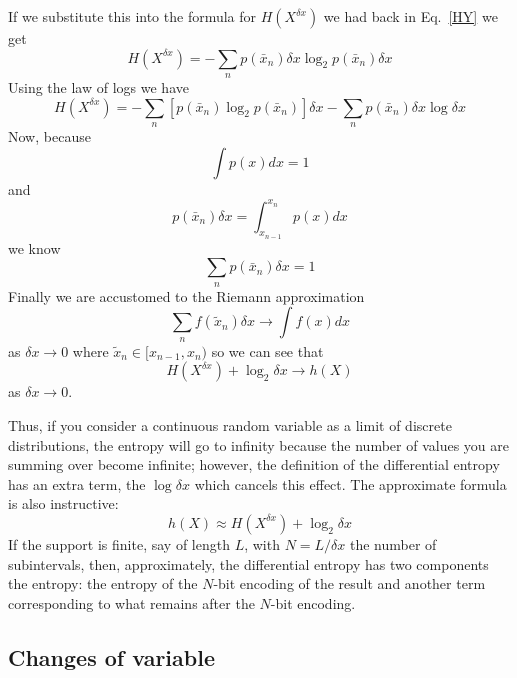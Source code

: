 \documentclass[12pt]{article}
\begin{document}
If we substitute this into the formula for $H(X^{\delta x})$ we had back in Eq.~\ref{HY} we get 
\begin{equation}
  H(X^{\delta x})=-\sum_n p(\bar{x}_n)\delta x \log_2{p(\bar{x}_n)\delta x}
\end{equation}
Using the law of logs we have
\begin{equation}
  H(X^{\delta x})=-\sum_n \left[p(\bar{x}_n) \log_2{p(\bar{x}_n)}\right] \delta x -\sum_np(\bar{x}_n)\delta x \log{\delta x}
\end{equation}
Now, because
\begin{equation}
  \int p(x)dx=1
\end{equation}
and 
\begin{equation}
  p(\bar{x}_n)\delta x=\int_{x_{n-1}}^{x_n}p(x)dx
\end{equation}
we know
\begin{equation}
  \sum_np(\bar{x}_n)\delta x=1     
\end{equation}
Finally we are accustomed to the Riemann approximation
\begin{equation}
  \sum_n f(\tilde{x}_n) \delta x\rightarrow \int f(x)dx 
\end{equation}
as $\delta x\rightarrow 0$ where $\tilde{x}_n\in [x_{n-1},x_n)$ so we can see that
    \begin{equation}
      H(X^{\delta x})+\log_2{\delta x}\rightarrow h(X)
    \end{equation}
    as $\delta x\rightarrow 0$.

Thus, if you consider a continuous random variable as a limit of
discrete distributions, the entropy will go to infinity because the
number of values you are summing over become infinite; however, the
definition of the differential entropy has an extra term, the
$\log{\delta x}$ which cancels this effect. The approximate formula is also instructive:
\begin{equation}
  h(X)\approx H(X^{\delta x}) +\log_2{\delta x}
\end{equation}
If the support is finite, say of length $L$, with $N=L/\delta x$ the
number of subintervals, then, approximately, the differential entropy
has two components the entropy: the entropy of the $N$-bit encoding of
the result and another term corresponding to what remains after the
$N$-bit encoding.

\subsection*{Changes of variable}
\end{document}

